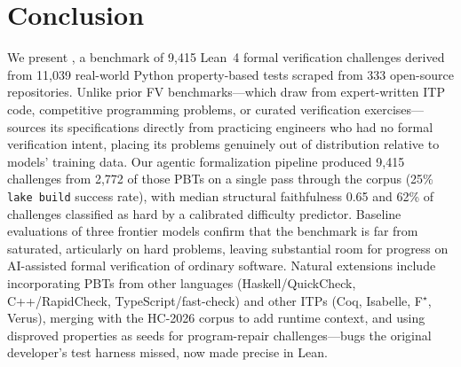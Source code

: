 \section{Conclusion}
We present \FVSpec, a benchmark of 9{,}415 Lean~4 formal verification challenges derived from 11{,}039 real-world Python property-based tests scraped from 333 open-source repositories. Unlike prior FV benchmarks---which draw from expert-written ITP code, competitive programming problems, or curated verification exercises---\FVSpec sources its specifications directly from practicing engineers who had no formal verification intent, placing its problems genuinely out of distribution relative to models' training data. Our agentic formalization pipeline produced 9{,}415 challenges from 2{,}772 of those PBTs on a single pass through the corpus (25\% \texttt{lake build} success rate), with median structural faithfulness 0.65 and 62\% of challenges classified as hard by a calibrated difficulty predictor. Baseline evaluations of three frontier models confirm that the benchmark is far from saturated, articularly on hard problems, leaving substantial room for progress on AI-assisted formal verification of ordinary software. Natural extensions include incorporating PBTs from other languages (Haskell/QuickCheck, C++/RapidCheck, TypeScript/fast-check) and other ITPs (Coq, Isabelle, F$^\star$, Verus), merging with the HC-2026 corpus to add runtime context, and using disproved properties as seeds for program-repair challenges---bugs the original developer's test harness missed, now made precise in Lean.
